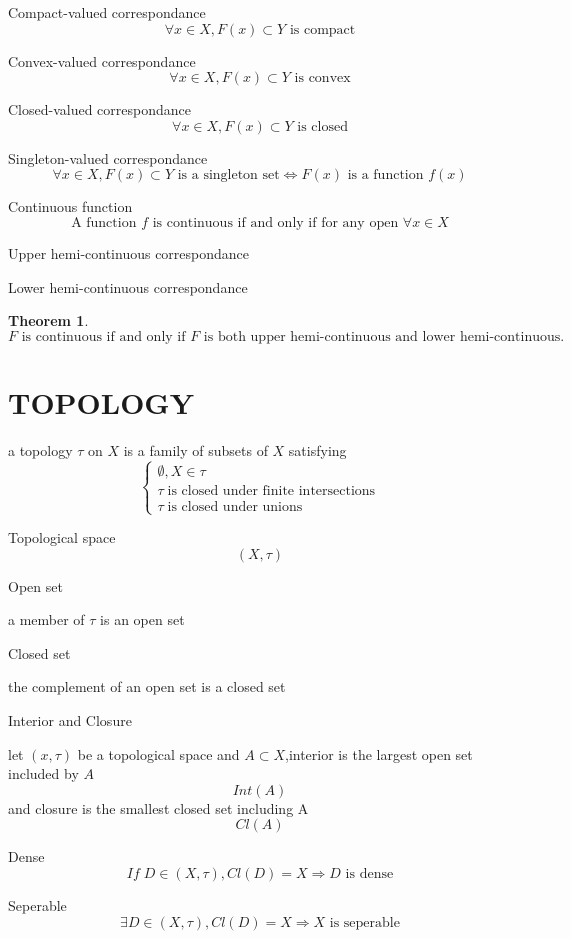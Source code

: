 \documentclass{article}
\newtheorem{theorem}{Theorem}
\begin{document}
Compact-valued correspondance
$$\forall x\in X, F(x)\subset Y \text{ is compact}$$

Convex-valued correspondance
$$\forall x\in X, F(x)\subset Y \text{ is convex}$$

Closed-valued correspondance
$$\forall x\in X, F(x)\subset Y \text{ is closed}$$

Singleton-valued correspondance
$$\forall x\in X, F(x)\subset Y \text{ is a singleton set} \iff F(x) \text{ is a function } f(x)$$

Continuous function
$$\text{A function }f \text{ is continuous if and only if for any open }\forall x\in X$$

Upper hemi-continuous correspondance

Lower hemi-continuous correspondance

\begin{theorem}
$$F \text{ is continuous if and only if }F \text{ is both upper hemi-continuous and lower hemi-continuous.}$$
\end{theorem}








\newpage
\section{TOPOLOGY}
a topology $\tau$ on $X$ is a family of subsets of $X$ satisfying
$$\begin{cases}
\emptyset, X\in \tau
\\ \tau\;\text{is closed under finite intersections}
\\ \tau\;\text{is closed under unions}
\end{cases}$$

Topological space
$$(X,\tau)$$

Open set

a member of $\tau$ is an open set

Closed set

the complement of an open set is a closed set

Interior and Closure

let $(x,\tau)$ be a topological space and $A\subset X$,interior is the largest open set included by $A$
$$Int(A)$$
and closure is the smallest closed set including A
$$Cl(A)$$

Dense
$$If \;D\in(X,\tau),Cl(D)=X \Rightarrow D\text{ is dense}$$

Seperable 
$$\exists D\in(X,\tau),Cl(D)=X \Rightarrow X \text{ is seperable}$$
\end{document}
